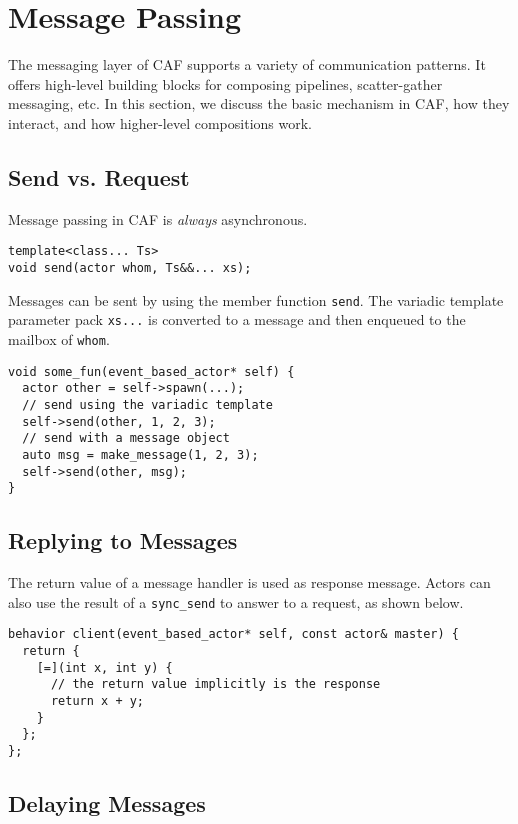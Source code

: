 \section{Message Passing}
\label{message-passing}

The messaging layer of CAF supports a variety of communication patterns. It offers high-level building blocks for composing pipelines, scatter-gather messaging, etc. In this section, we discuss the basic mechanism in CAF, how they interact, and how higher-level compositions work.

\subsection{Send vs. Request}

Message passing in CAF is \emph{always} asynchronous.

\begin{lstlisting}
template<class... Ts>
void send(actor whom, Ts&&... xs);
\end{lstlisting}

Messages can be sent by using the member function \lstinline^send^.
The variadic template parameter pack \lstinline^xs...^ is converted to a message and then enqueued to the mailbox of \lstinline^whom^.

\begin{lstlisting}
void some_fun(event_based_actor* self) {
  actor other = self->spawn(...);
  // send using the variadic template
  self->send(other, 1, 2, 3);
  // send with a message object
  auto msg = make_message(1, 2, 3);
  self->send(other, msg);
}
\end{lstlisting}

\subsection{Replying to Messages}
\label{reply}

The return value of a message handler is used as response message.
Actors can also use the result of a \lstinline^sync_send^ to answer to a request, as shown below.

\begin{lstlisting}
behavior client(event_based_actor* self, const actor& master) {
  return {
    [=](int x, int y) {
      // the return value implicitly is the response
      return x + y;
    }
  };
};
\end{lstlisting}

\subsection{Delaying Messages}

